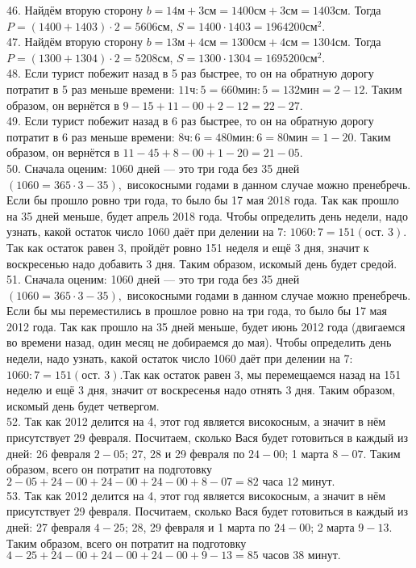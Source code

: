 46. Найдём вторую сторону $b=14\text{м}+3\text{см}=1400\text{см}+3\text{см}=1403\text{см}.$ Тогда $P=(1400+1403)\cdot2=5606$см, $S=1400\cdot1403=1964200\text{см}^2.$\\
47. Найдём вторую сторону $b=13\text{м}+4\text{см}=1300\text{см}+4\text{см}=1304\text{см}.$ Тогда $P=(1300+1304)\cdot2=5208$см, $S=1300\cdot1304=1695200\text{см}^2.$\\
48. Если турист побежит назад в 5 раз быстрее, то он на обратную дорогу потратит в 5 раз меньше времени: $11\text{ч}:5=660\text{мин}:5=132\text{мин}=2-12.$ Таким образом, он вернётся в $9-15+11-00+2-12=22-27.$\\
49. Если турист побежит назад в 6 раз быстрее, то он на обратную дорогу потратит в 6 раз меньше времени: $8\text{ч}:6=480\text{мин}:6=80\text{мин}=1-20.$ Таким образом, он вернётся в $11-45+8-00+1-20=21-05.$\\
50. Сначала оценим: 1060 дней --- это три года без 35 дней $(1060=365\cdot3-35),$ високосными годами в данном случае можно пренебречь. Если бы прошло ровно три года, то было бы 17 мая 2018 года. Так как прошло на 35 дней меньше, будет апрель 2018 года. Чтобы определить день недели, надо узнать, какой остаток число 1060 даёт при делении на 7: $1060:7=151 (\text{ост. } 3).$Так как остаток равен 3, пройдёт ровно 151 неделя и ещё 3 дня, значит к воскресенью надо добавить 3 дня. Таким образом, искомый день будет средой.\\
51. Сначала оценим: 1060 дней --- это три года без 35 дней $(1060=365\cdot3-35),$ високосными годами в данном случае можно пренебречь. Если бы мы переместились в прошлое ровно на три года, то было бы 17 мая 2012 года. Так как прошло на 35 дней меньше, будет июнь 2012 года (двигаемся во времени назад, один месяц не добираемся до мая). Чтобы определить день недели, надо узнать, какой остаток число 1060 даёт при делении на 7: $1060:7=151 (\text{ост. } 3).$Так как остаток равен 3, мы перемещаемся назад на 151 неделю и ещё 3 дня, значит от воскресенья надо отнять 3 дня. Таким образом, искомый день будет четвергом.\\
52. Так как 2012 делится на 4, этот год является високосным, а значит в нём присутствует 29 февраля. Посчитаем, сколько Вася будет готовиться в каждый из дней: 26 февраля $2-05$; 27, 28 и 29 февраля по $24-00$; 1 марта $8-07.$ Таким образом, всего он потратит на подготовку $2-05+24-00+24-00+24-00+8-07=82\text{ часа }12\text{ минут.}$\\
53. Так как 2012 делится на 4, этот год является високосным, а значит в нём присутствует 29 февраля. Посчитаем, сколько Вася будет готовиться в каждый из дней: 27 февраля $4-25$; 28, 29 февраля и 1 марта по $24-00$; 2 марта $9-13.$ Таким образом, всего он потратит на подготовку $4-25+24-00+24-00+24-00+9-13=85\text{ часов }38\text{ минут.}$\\
